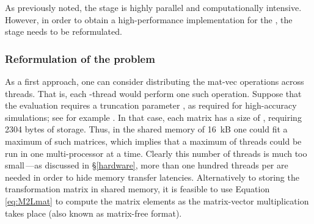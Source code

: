As previously noted, the {\ML} stage is highly parallel and computationally intensive. However, in order to obtain a high-performance implementation for the {\gpu}, the {\ML} stage needs to be reformulated.

\subsubsection{Reformulation of the {\ML} problem}

As a first approach,  one can consider distributing the mat-vec operations across threads.  That is, each {\cuda}-thread would perform one such operation.  Suppose that the evaluation requires a truncation parameter , as required for high-accuracy simulations; see for example \cite{CruzBarba2009}. In that case, each matrix has a size of , requiring 2304 bytes of storage.  Thus, in the {\gpu} shared memory of 16~kB one could fit a maximum of  such matrices, which implies that a maximum of  threads could be run in one multi-processor at a time. Clearly this number of threads is much too small\,---as discussed in \S\ref{hardware}, more than one hundred threads per {\sm} are needed in order to hide memory transfer latencies. Alternatively to storing the transformation matrix in shared memory, it is feasible to use Equation \eqref{eq:M2Lmat} to compute the matrix elements as the matrix-vector multiplication takes place (also known as matrix-free format). 
